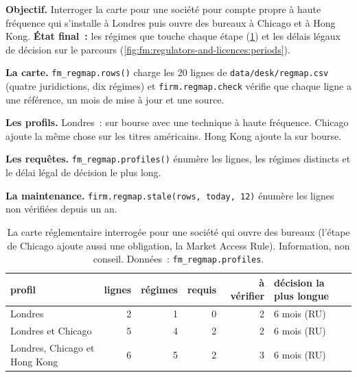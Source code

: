 \begin{tutorial}
\textbf{Objectif.} Interroger la carte pour une société pour compte propre à haute fréquence qui s'installe à Londres puis ouvre des bureaux à Chicago et à Hong Kong.
\textbf{État final~:} les régimes que touche chaque étape (\cref{tab:fm:regulators-and-licences:profiles}) et les délais légaux de décision sur le parcours
(\cref{fig:fm:regulators-and-licences:periods}).
\begin{tutsteps}
\item \textbf{La carte.} \texttt{fm\_regmap.rows()} charge les 20 lignes de \texttt{data/desk/regmap.csv} (quatre juridictions, dix régimes) et
\texttt{firm.regmap.check} vérifie que chaque ligne a une référence, un mois de mise à jour et une source.
\item \textbf{Les profils.} Londres~:  sur bourse avec une technique à haute fréquence. Chicago ajoute la même chose sur les titres américains.
Hong Kong ajoute la  sur bourse.
\item \textbf{Les requêtes.} \texttt{fm\_regmap.profiles()} énumère les lignes, les régimes distincts et le délai légal de décision le plus long.
\item \textbf{La maintenance.} \texttt{firm.regmap.stale(rows, today, 12)} énumère les lignes non vérifiées depuis un an.
\end{tutsteps}
\end{tutorial}

\begin{table}[ht]
\centering\small
\begin{tabular}{lrrrrl}
\toprule
profil & lignes & régimes & requis & à vérifier & décision la plus longue \\
\midrule
Londres & 2 & 1 & 0 & 2 & 6 mois (RU) \\
Londres et Chicago & 5 & 4 & 2 & 2 & 6 mois (RU) \\
Londres, Chicago et Hong Kong & 6 & 5 & 2 & 3 & 6 mois (RU) \\
\bottomrule
\end{tabular}
\caption{La carte réglementaire interrogée pour une société qui ouvre des bureaux (l'étape de Chicago ajoute aussi une obligation, la Market Access Rule). Information,
non conseil. Données~: \texttt{fm\_regmap.profiles}.}\label{tab:fm:regulators-and-licences:profiles}
\end{table}

